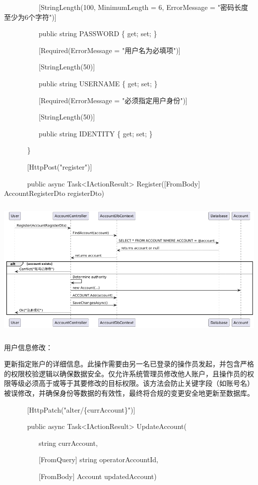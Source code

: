 \documentclass[]{article}
\begin{document}
~ ~ ~ ~ ~ ~ {[}StringLength(100, MinimumLength = 6, ErrorMessage =
"密码长度至少为6个字符"){]}

~ ~ ~ ~ ~ ~ public string PASSWORD \{ get; set; \}

~ ~ ~ ~ ~ ~ {[}Required(ErrorMessage = "用户名为必填项"){]}

~ ~ ~ ~ ~ ~ {[}StringLength(50){]}

~ ~ ~ ~ ~ ~ public string USERNAME \{ get; set; \}

~ ~ ~ ~ ~ ~ {[}Required(ErrorMessage = "必须指定用户身份"){]}

~ ~ ~ ~ ~ ~ {[}StringLength(50){]}

~ ~ ~ ~ ~ ~ public string IDENTITY \{ get; set; \}

~ ~ ~ ~ \}

~ ~ ~ ~ {[}HttpPost("register"){]}

~ ~ ~ ~ public async Task\textless{}IActionResult\textgreater{}
Register({[}FromBody{]} AccountRegisterDto registerDto)

\includegraphics[width=5.75347in,height=2.69097in]{media/media/image6.png}

用户信息修改：

更新指定账户的详细信息。此操作需要由另一名已登录的操作员发起，并包含严格的权限校验逻辑以确保数据安全。仅允许系统管理员修改他人账户，且操作员的权限等级必须高于或等于其要修改的目标权限。该方法会防止关键字段（如账号名）被误修改，并确保身份等数据的有效性，最终将合规的变更安全地更新至数据库。

~ ~ ~ ~ {[}HttpPatch("alter/\{currAccount\}"){]}

~ ~ ~ ~ public async Task\textless{}IActionResult\textgreater{}
UpdateAccount(

~ ~ ~ ~ ~ ~ string currAccount,

~ ~ ~ ~ ~ ~ {[}FromQuery{]} string operatorAccountId,

~ ~ ~ ~ ~ ~ {[}FromBody{]} Account updatedAccount)
\end{document}
